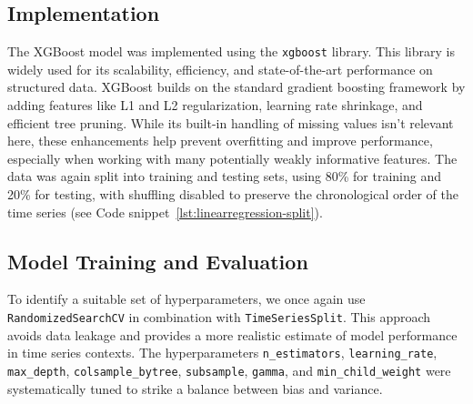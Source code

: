 \subsection{Implementation}
\label{sec:xgboost-implementation}
The XGBoost model was implemented using the \texttt{xgboost} library. This library is widely used for its scalability, efficiency, and state-of-the-art performance on structured data. 
XGBoost builds on the standard gradient boosting framework by adding features like L1 and L2 regularization, learning rate shrinkage, and efficient tree pruning. 
While its built-in handling of missing values isn’t relevant here, these enhancements help prevent overfitting and improve performance, especially when working with many potentially weakly informative features.
The data was again split into training and testing sets, using 80\% for training and 20\% for testing, with shuffling disabled to preserve the chronological order of the time series (see Code snippet~\ref{lst:linearregression-split}).

\subsection{Model Training and Evaluation}
\label{sec:xgboost-training}
To identify a suitable set of hyperparameters, we once again use \texttt{RandomizedSearchCV} in combination with \texttt{TimeSeriesSplit}. 
This approach avoids data leakage and provides a more realistic estimate of model performance in time series contexts.
The hyperparameters \texttt{n\_estimators}, \texttt{learning\_rate}, \texttt{max\_depth}, \texttt{colsample\_bytree}, \texttt{subsample}, \texttt{gamma}, and \texttt{min\_child\_weight} were systematically tuned to strike a balance between bias and variance.

